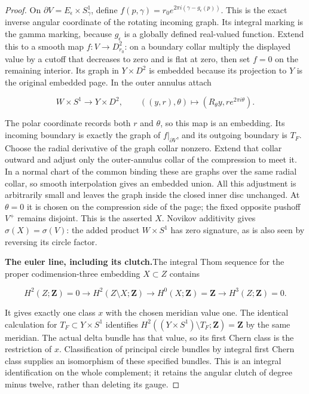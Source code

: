 \begin{proof}
On \(\partial V=E_\epsilon\times S^1_\gamma\), define
\(f(p,\gamma)=r_0e^{2\pi i(\gamma-g_\epsilon(p))}\).
This is the exact inverse angular coordinate of the rotating
incoming graph.  Its integral marking is the gamma marking,
because \(g_\epsilon\) is a globally defined real-valued function.
Extend this to a smooth map
\(f:V\to D^2_{r_0}\): on a boundary collar multiply the displayed
value by a cutoff that decreases to zero and is flat at zero,
then set \(f=0\) on the remaining interior.  Its graph in
\(Y\times D^2\) is embedded because its projection to \(Y\) is the
original embedded page.  In the outer annulus attach

\[
 W\times S^1\longrightarrow Y\times D^2,
 \qquad ((y,r),\theta)\longmapsto
 (R_\theta y,r e^{2\pi i\theta}).
\]

The polar coordinate records both \(r\) and \(\theta\), so this
map is an embedding.  Its incoming boundary is exactly the graph
of \(f|_{\partial V}\), and its outgoing boundary is \(T_F\).
Choose the radial derivative of the graph collar nonzero.  Extend
that collar outward and adjust only the outer-annulus collar of
the compression to meet it.  In a normal chart of the common
binding these are graphs over the same radial collar, so smooth
interpolation gives an embedded union.  All this adjustment is
arbitrarily small and leaves the graph inside the closed inner
disc unchanged.  At \(\theta=0\) it is chosen on the compression
side of the page; the fixed opposite pushoff \(V^+\) remains
disjoint.  This is the asserted \(X\).  Novikov additivity gives
\(\sigma(X)=\sigma(V)\): the added product \(W\times S^1\) has zero
signature, as is also seen by reversing its circle factor.

\par\medskip\noindent\textbf{The euler line, including its clutch.}\enspace The integral Thom
sequence for the proper codimension-three embedding \(X\subset Z\)
contains

\[
 H^2(Z;\mathbf Z)=0\longrightarrow H^2(Z\setminus X;\mathbf Z)
 \longrightarrow H^0(X;\mathbf Z)=\mathbf Z
 \longrightarrow H^3(Z;\mathbf Z)=0.
\]

It gives exactly one class \(x\) with the chosen meridian value one.
The identical calculation for
\(T_F\subset Y\times S^1\) identifies
\(H^2((Y\times S^1)\setminus T_F;\mathbf Z)=\mathbf Z\)
by the same meridian.  The actual delta bundle has that value,
so its first Chern class is the restriction of \(x\).  Classification
of principal circle bundles by integral first Chern class supplies
an isomorphism of these specified bundles.  This is an integral
identification on the whole complement; it retains the angular
clutch of degree minus twelve, rather than deleting its gauge.


\end{proof}
